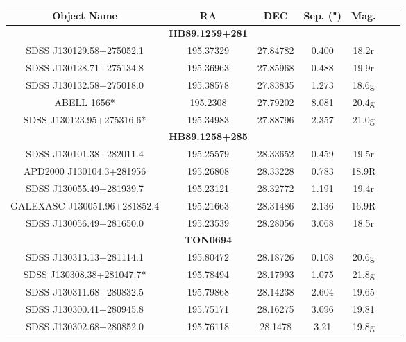 \begin{table}
\small
\begin{tabular}{ c c c c c c c }
\hline
Object Name & RA & DEC & Sep. (") & Mag.\\
\hline
& \textbf{HB89.1259+281}&&&\\
\hline
SDSS J130129.58+275052.1 & 195.37329 & 27.84782 & 0.400 & 18.2r \\
SDSS J130128.71+275134.8 & 195.36963 & 27.85968 & 0.488 & 19.9r \\
SDSS J130132.58+275018.0 & 195.38578 & 27.83835 & 1.273 & 18.6g\\
ABELL 1656* & 195.2308 & 27.79202 & 8.081 & 20.4g\\
SDSS J130123.95+275316.6* & 195.34983 & 27.88796 & 2.357 & 21.0g\\
\hline
& \textbf{HB89.1258+285} &&&\\
\hline
SDSS J130101.38+282011.4 & 195.25579 & 28.33652 & 0.459 & 19.5r\\
APD2000 J130104.3+281956 & 195.26808 & 28.33228 & 0.783 & 18.9R\\
SDSS J130055.49+281939.7 & 195.23121 & 28.32772 & 1.191 & 19.4r\\
GALEXASC J130051.96+281852.4 & 195.21663 & 28.31486 & 2.136 & 16.9R\\
SDSS J130056.49+281650.0 & 195.23539 & 28.28056 & 3.068 & 18.5r\\
\hline
& \textbf{TON0694} &&&\\
\hline
SDSS J130313.13+281114.1 & 195.80472 & 28.18726 & 0.108 & 20.6g\\
SDSS J130308.38+281047.7* & 195.78494 & 28.17993 & 1.075 & 21.8g\\
SDSS J130311.68+280832.5 & 195.79868 & 28.14238 & 2.604 & 19.65\\
SDSS J130300.41+280945.8 & 195.75171 & 28.16275 & 3.096 & 19.81\\
SDSS J130302.68+280852.0 & 195.76118 & 28.1478 & 3.21 & 19.8g\\

\end{tabular}
\end{table}
